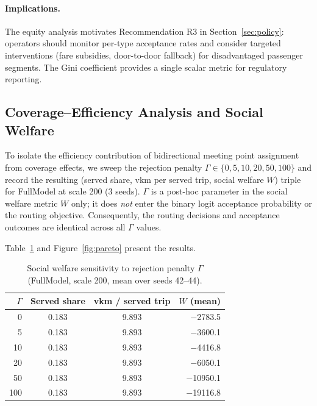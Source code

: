 \paragraph{Implications.}
The equity analysis motivates Recommendation R3 in Section~\ref{sec:policy}:
operators should monitor per-type acceptance rates and consider targeted
interventions (fare subsidies, door-to-door fallback) for disadvantaged
passenger segments. The Gini coefficient provides a single scalar metric
for regulatory reporting.

\subsection{Coverage--Efficiency Analysis and Social Welfare}
\label{sec:pareto}

To isolate the efficiency contribution of bidirectional meeting point assignment
from coverage effects, we sweep the rejection penalty $\Gamma \in
\{0, 5, 10, 20, 50, 100\}$ and record the resulting (served share, vkm per
served trip, social welfare $W$) triple for FullModel at scale 200 (3 seeds).
$\Gamma$ is a post-hoc parameter in the social welfare metric $W$ only; it does
\emph{not} enter the binary logit acceptance probability or the routing
objective. Consequently, the routing decisions and acceptance outcomes are
identical across all $\Gamma$ values.

Table~\ref{tab:pareto} and Figure~\ref{fig:pareto} present the results.

\begin{table}[h]
\centering
\caption{Social welfare sensitivity to rejection penalty $\Gamma$
(FullModel, scale 200, mean over seeds 42--44).}
\label{tab:pareto}
\begin{tabular}{rccr}
\toprule
$\Gamma$ & Served share & vkm / served trip & $W$ (mean) \\
\midrule
0   & 0.183 & 9.893 & $-$2783.5 \\
5   & 0.183 & 9.893 & $-$3600.1 \\
10  & 0.183 & 9.893 & $-$4416.8 \\
20  & 0.183 & 9.893 & $-$6050.1 \\
50  & 0.183 & 9.893 & $-$10950.1 \\
100 & 0.183 & 9.893 & $-$19116.8 \\
\bottomrule
\end{tabular}
\end{table}

